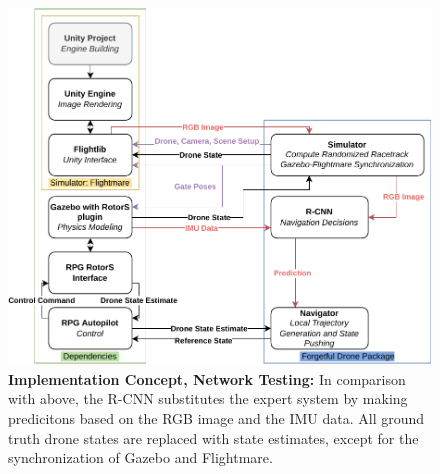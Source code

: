 \begin{figure}[H]
    \centering
    \includegraphics[width=1.0\textwidth]{figures/implementation_concept_network_testing.drawio.pdf}
    \caption[Implementation Concept, Network Testing]{\textbf{Implementation Concept, Network Testing:}
	In comparison with above, the R-CNN substitutes the expert system by making predicitons based on the
	RGB image and the IMU data. All ground truth drone states are replaced with state estimates, 
	except for the synchronization of Gazebo and Flightmare.}
    \label{fig:OverviewDiagram}
\end{figure}










